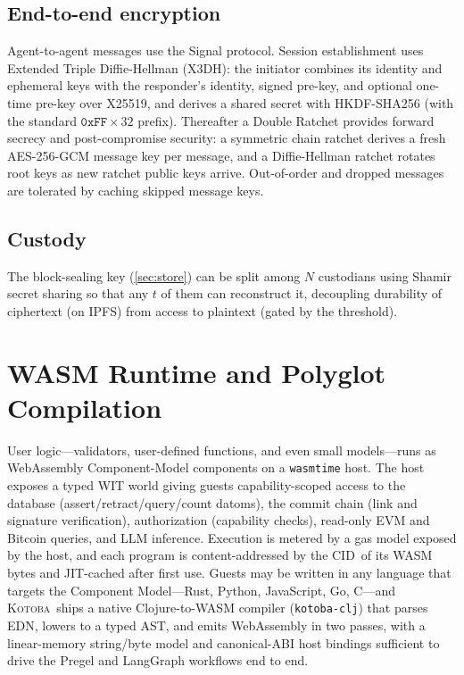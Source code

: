 \documentclass[11pt]{article}
\newcommand{\kotoba}{\textsc{Kotoba}}
\newcommand{\cid}{\textsf{CID}}
\begin{document}
\subsection{End-to-end encryption}
Agent-to-agent messages use the Signal protocol. Session establishment uses
Extended Triple Diffie-Hellman (X3DH): the initiator combines its identity and
ephemeral keys with the responder's identity, signed pre-key, and optional
one-time pre-key over X25519, and derives a shared secret with HKDF-SHA256 (with
the standard $\mathtt{0xFF}{\times}32$ prefix). Thereafter a Double Ratchet
provides forward secrecy and post-compromise security: a symmetric chain ratchet
derives a fresh AES-256-GCM message key per message, and a Diffie-Hellman ratchet
rotates root keys as new ratchet public keys arrive. Out-of-order and dropped
messages are tolerated by caching skipped message keys.

\subsection{Custody}
The block-sealing key (\cref{sec:store}) can be split among $N$ custodians using
Shamir secret sharing so that any $t$ of them can reconstruct it, decoupling
durability of ciphertext (on IPFS) from access to plaintext (gated by the
threshold).

\section{WASM Runtime and Polyglot Compilation}
\label{sec:wasm}

User logic---validators, user-defined functions, and even small models---runs as
WebAssembly Component-Model components on a \texttt{wasmtime} host. The host
exposes a typed WIT world giving guests capability-scoped access to the database
(assert/retract/query/count datoms), the commit chain (link and signature
verification), authorization (capability checks), read-only EVM and Bitcoin
queries, and LLM inference. Execution is metered by a gas model exposed by the
host, and each program is content-addressed by the \cid\ of its WASM
bytes and JIT-cached after first use. Guests may be written in any language that
targets the Component Model---Rust, Python, JavaScript, Go, C---and \kotoba\
ships a native Clojure-to-WASM compiler (\texttt{kotoba-clj}) that parses EDN,
lowers to a typed AST, and emits WebAssembly in two passes, with a linear-memory
string/byte model and canonical-ABI host bindings sufficient to drive the Pregel
and LangGraph workflows end to end.
\end{document}
